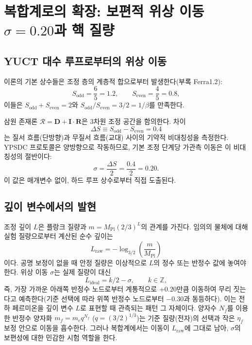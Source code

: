 \documentclass[12pt,a4paper]{article}
\begin{document}
	\section{복합계로의 확장: 보편적 위상 이동 \(\sigma=0.20\)과 핵 질량}
	\label{sec:sigma_nuclear}
	
	\subsection{YUCT 대수 루프로부터의 위상 이동}
	
	이론의 기본 상수들은 조정 층의 계층적 합으로부터 발생한다(부록 Ferra1.2):
	\[
	S_{\mathrm{odd}} = \frac{6}{5}=1.2,\qquad S_{\mathrm{even}} = \frac{4}{5}=0.8,
	\]
	이들은 \(S_{\mathrm{odd}}+S_{\mathrm{even}}=2\)와 \(S_{\mathrm{odd}}/S_{\mathrm{even}} = 3/2 = 1/\beta\)를 만족한다.
	
	삼원 존재론 \(\mathcal{R} = \mathbf{D} + \mathbf{I}\!\cdot\!\mathbf{R}\)은 3차원 조정 공간을 함의한다. 차이
	\[
	\Delta S \equiv S_{\mathrm{odd}} - S_{\mathrm{even}} = 0.4
	\]
	는 질서 흐름(단방향)과 무질서 흐름(교대) 사이의 기약적 비대칭성을 측정한다. YPSDC 프로토콜은 양방향으로 작동하므로, 기본 조정 단계당 가관측 이동은 이 비대칭성의 절반이다:
	\begin{equation}
		\boxed{\sigma = \frac{\Delta S}{2} = \frac{0.4}{2} = 0.20.}
		\label{eq:sigma_fermion_paper}
	\end{equation}
	이 값은 매개변수 없이, 하드 루프 상수로부터 직접 도출된다.
	
	\subsection{깊이 변수에서의 발현}
	
	조정 깊이 \(L\)은 플랑크 질량과 \(m = M_{\mathrm{Pl}}(2/3)^L\)의 관계를 가진다. 임의의 물체에 대해 실험 질량으로부터 계산된 순수 깊이는
	\begin{equation}
		L_{\mathrm{raw}} = -\log_{3/2}\!\left(\frac{m}{M_{\mathrm{Pl}}}\right)
	\end{equation}
	이다. 공명 보정이 없을 때 안정 질량은 이상적으로 \(L\)의 정수 또는 반정수 값에 놓여야 한다. 위상 이동 \(\sigma\)는 실제 질량이 대신
	\[
	L_{\mathrm{ideal}} = k/2 - \sigma, \qquad k\in\mathbb{Z},
	\]
	즉, 가장 가까운 아래쪽 반정수 노드로부터 계통적으로 \(+0.20\)만큼 이동하여 무리 짓는다고 예측한다(기준 선택에 따라 위쪽 반정수 노드로부터 \(-0.30\)과 동등하다). 이는 전하 페르미온을 깊이 변수 \(L\)로 표현할 때 관측되는 패턴 그 자체이다. 양자수 \(N_f\)를 이용한 반정수 양자화 \(m_f = m_e q^{N_f}\) (\(q=(3/2)^{1/3}\))는 기준 질량(전자)의 선택과 작은 \(\eta_f\) 보정 안으로 이동을 흡수한다. 그러나 복합계에서는 이동이 \(L_{\mathrm{raw}}\)에 그대로 남아, \(\sigma\)의 보편성에 대한 민감한 시험 역할을 한다.
	
\end{document}
